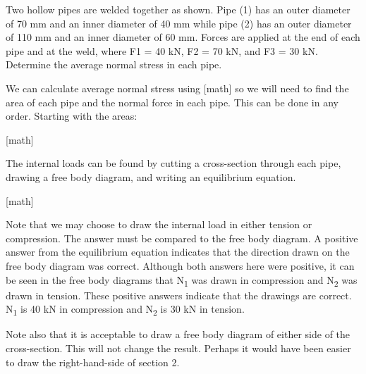 \documentclass[
  letterpaper,
  DIV=11,
  numbers=noendperiod]{scrreprt}
\begin{document}
\begin{tcolorbox}[enhanced jigsaw, colbacktitle=quarto-callout-note-color!10!white, title={Example 2.2: Normal stress with multiple loads/sections}, coltitle=black, leftrule=.75mm, rightrule=.15mm, opacityback=0, breakable, colframe=quarto-callout-note-color-frame, left=2mm, arc=.35mm, colback=white, bottomrule=.15mm, bottomtitle=1mm, toptitle=1mm, titlerule=0mm, opacitybacktitle=0.6, toprule=.15mm]

Two hollow pipes are welded together as shown. Pipe (1) has an outer
diameter of 70 mm and an inner diameter of 40 mm while pipe (2) has an
outer diameter of 110 mm and an inner diameter of 60 mm. Forces are
applied at the end of each pipe and at the weld, where F1 = 40 kN, F2 =
70 kN, and F3 = 30 kN. Determine the average normal stress in each pipe.

\begin{tcolorbox}[enhanced jigsaw, colbacktitle=quarto-callout-note-color!10!white, title={Solution}, coltitle=black, leftrule=.75mm, rightrule=.15mm, opacityback=0, breakable, colframe=quarto-callout-note-color-frame, left=2mm, arc=.35mm, colback=white, bottomrule=.15mm, bottomtitle=1mm, toptitle=1mm, titlerule=0mm, opacitybacktitle=0.6, toprule=.15mm]

We can calculate average normal stress using {[}math{]} so we will need
to find the area of each pipe and the normal force in each pipe. This
can be done in any order. Starting with the areas:

{[}math{]}

The internal loads can be found by cutting a cross-section through each
pipe, drawing a free body diagram, and writing an equilibrium equation.

{[}math{]}

Note that we may choose to draw the internal load in either tension or
compression. The answer must be compared to the free body diagram. A
positive answer from the equilibrium equation indicates that the
direction drawn on the free body diagram was correct. Although both
answers here were positive, it can be seen in the free body diagrams
that N\textsubscript{1} was drawn in compression and N\textsubscript{2}
was drawn in tension. These positive answers indicate that the drawings
are correct. N\textsubscript{1} is 40 kN in compression and
N\textsubscript{2} is 30 kN in tension.

Note also that it is acceptable to draw a free body diagram of either
side of the cross-section. This will not change the result. Perhaps it
would have been easier to draw the right-hand-side of section 2.


\end{tcolorbox}
\end{tcolorbox}
\end{document}
